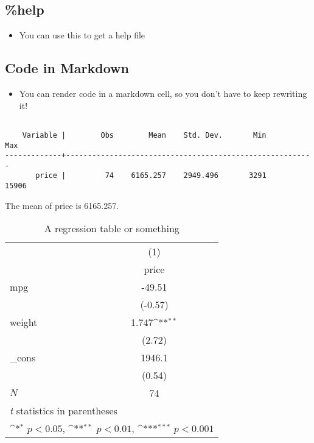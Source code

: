 \documentclass[10pt,parskip=half,
	toc=sectionentrywithdots,
	bibliography=totocnumbered,
	captions=tableheading,numbers=noendperiod]{scrartcl}
\providecommand{\tightlist}{%
  \setlength{\itemsep}{0pt}\setlength{\parskip}{0pt}}
\begin{document}
\hypertarget{help}{%
\subsection{\%help}\label{help}}

\begin{itemize}
\tightlist
\item
  You can use this to get a help file
\end{itemize}

\hypertarget{code-in-markdown}{%
\subsection{Code in Markdown}\label{code-in-markdown}}

\begin{itemize}
\tightlist
\item
  You can render code in a markdown cell, so you don't have to keep
  rewriting it!
\end{itemize}

\begin{lstlisting}[language={},postbreak={},numbers=none,xrightmargin=7pt,belowskip=5pt,aboveskip=5pt,breakindent=0pt]

    Variable |        Obs        Mean    Std. Dev.       Min        Max
-------------+---------------------------------------------------------
       price |         74    6165.257    2949.496       3291      15906

\end{lstlisting}

The mean of price is 6165.257.

\begin{table}[H]\caption{A regression table or something}\label{tbl:tlabelreg2}

\centering
\begin{adjustbox}{max width=\textwidth}

{
\def\sym#1{\ifmmode^{#1}\else\(^{#1}\)\fi}
\begin{tabular}{l*{1}{c}}
\hline\hline
            &\multicolumn{1}{c}{(1)}\\
            &\multicolumn{1}{c}{price}\\
\hline
mpg         &      -49.51         \\
            &     (-0.57)         \\
[1em]
weight      &       1.747\sym{**} \\
            &      (2.72)         \\
[1em]
\_cons      &      1946.1         \\
            &      (0.54)         \\
\hline
\(N\)       &          74         \\
\hline\hline
\multicolumn{2}{l}{\footnotesize \textit{t} statistics in parentheses}\\
\multicolumn{2}{l}{\footnotesize \sym{*} \(p<0.05\), \sym{**} \(p<0.01\), \sym{***} \(p<0.001\)}\\
\end{tabular}
}

\end{adjustbox}
\end{table}
\end{document}
